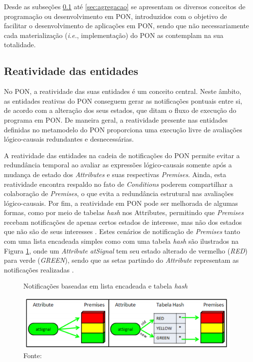Desde as subseções \ref{sec:reatividade} até \ref{sec:agregacao} se apresentam
os diversos conceitos de programação ou desenvolvimento em PON, introduzidos com
o objetivo de facilitar o desenvolvimento de aplicações em PON, sendo que não
necessariamente cada materialização (\textit{i.e.}, implementação) do PON as
contemplam na sua totalidade.

\subsection{Reatividade das entidades}\label{sec:reatividade}

No PON, a reatividade das suas entidades é um conceito central. Neste âmbito, as
entidades reativas do PON conseguem gerar as notificações pontuais entre si, de
acordo com a alteração dos seus estados, que ditam o fluxo de execução do
programa em PON. De maneira geral, a reatividade presente nas entidades
definidas no metamodelo do PON proporciona uma execução livre de avaliações
lógico-causais redundantes e desnecessárias. 

A reatividade das entidades na cadeia de notificações do PON permite evitar a
redundância temporal ao avaliar as expressões lógico-causais somente após a
mudança de estado dos \textit{Attributes} e suas respectivas \textit{Premises}.
Ainda, esta reatividade encontra respaldo no fato de \textit{Conditions} poderem
compartilhar a colaboração de \textit{Premises}, o que evita a redundância
estrutural nas avaliações lógico-causais. Por fim, a reatividade em PON pode ser
melhorada de algumas formas, como por meio de tabelas \textit{hash} nos
Attributes, permitindo que \textit{Premises} recebam notificações de apenas
certos estados de interesse, mas não dos estados que não são de seus interesses
\cite{msc_Banaszewski_2009}. Estes cenários de notificação de \textit{Premises}
tanto com uma lista encadeada simples como com uma tabela \textit{hash} são
ilustrados na Figura \ref{fig:hash_not}, onde um \textit{Attribute}
\textit{atSignal} tem seu estado alterado de vermelho (\textit{RED}) para verde
(\textit{GREEN}), sendo que as setas partindo do \textit{Attribute} representam
as notificações realizadas \cite{msc_Banaszewski_2009}.

\begin{figure}[!htb]
  \centering
  \caption{Notificações baseadas em lista encadeada e tabela \textit{hash}}
  \includegraphics[width=\textwidth]{../figures/hash_not.png}
  \smallskip
  \caption*{Fonte: }
  \label{fig:hash_not}
\end{figure}

